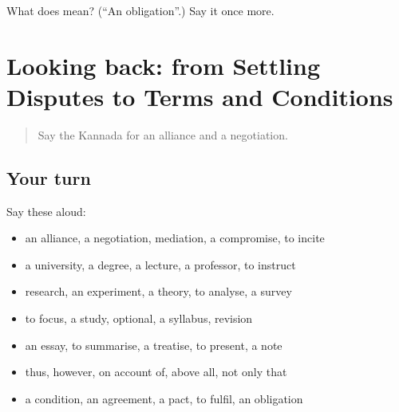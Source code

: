 \begin{tcolorbox}[breakable,colback=teal!4,colframe=teal!35!black,title={Before you move on}]
What does  mean? (\textquotedblleft{}An obligation\textquotedblright{}.) Say it once more.
\end{tcolorbox}
\section[(dialogue)]{Looking back: from Settling Disputes to Terms and Conditions}

\label{lesson:KA-R411-review-405-411}



\begin{quote}
Say the Kannada for an alliance and a negotiation.
\end{quote}

\subsection*{Your turn}
Say these aloud:

\begin{itemize}
\raggedright
  \item an alliance, a negotiation, mediation, a compromise, to incite
  \item a university, a degree, a lecture, a professor, to instruct
  \item research, an experiment, a theory, to analyse, a survey
  \item to focus, a study, optional, a syllabus, revision
  \item an essay, to summarise, a treatise, to present, a note
  \item thus, however, on account of, above all, not only that
  \item a condition, an agreement, a pact, to fulfil, an obligation
\end{itemize}

